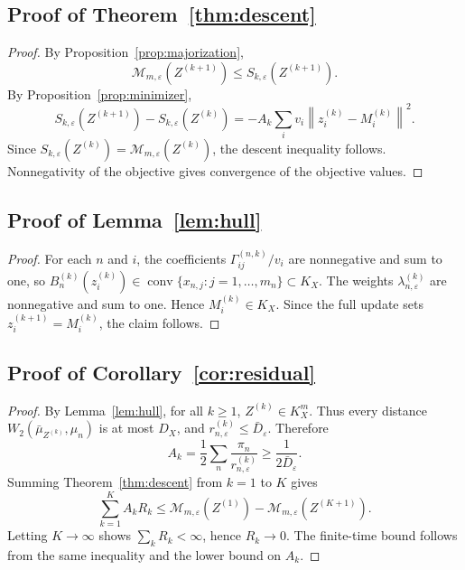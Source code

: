 \documentclass[pdflatex,sn-mathphys-ay]{sn-jnl}%
\theoremstyle{thmstyleone}%
\theoremstyle{thmstyletwo}%
\theoremstyle{thmstylethree}%
\newcommand{\calM}{\mathcal M}
\newcommand{\eps}{\varepsilon}
\newcommand{\barmu}{\bar\mu}
\newcommand{\conv}{\operatorname{conv}}
\newcommand{\norm}[1]{\left\lVert #1\right\rVert}
\begin{document}
\begin{appendices}
\subsection{Proof of Theorem~\ref{thm:descent}}
\begin{proof}
By Proposition~\ref{prop:majorization},
\[
\calM_{m,\eps}(Z^{(k+1)})\le S_{k,\eps}(Z^{(k+1)}).
\]
By Proposition~\ref{prop:minimizer},
\[
S_{k,\eps}(Z^{(k+1)})-S_{k,\eps}(Z^{(k)})
=
-A_k\sum_i v_i\norm{z_i^{(k)}-M_i^{(k)}}^2.
\]
Since \(S_{k,\eps}(Z^{(k)})=\calM_{m,\eps}(Z^{(k)})\), the descent inequality follows. Nonnegativity of the objective gives convergence of the objective values.
\end{proof}

\subsection{Proof of Lemma~\ref{lem:hull}}
\begin{proof}
For each \(n\) and \(i\), the coefficients \(\Gamma_{ij}^{(n,k)}/v_i\) are nonnegative and sum to one, so \(B_n^{(k)}(z_i^{(k)})\in\conv\{x_{n,j}:j=1,\ldots,m_n\}\subset K_X\). The weights \(\lambda_{n,\eps}^{(k)}\) are nonnegative and sum to one. Hence \(M_i^{(k)}\in K_X\). Since the full update sets \(z_i^{(k+1)}=M_i^{(k)}\), the claim follows.
\end{proof}

\subsection{Proof of Corollary~\ref{cor:residual}}
\begin{proof}
By Lemma~\ref{lem:hull}, for all \(k\ge1\), \(Z^{(k)}\in K_X^m\). Thus every distance \(W_2(\barmu_{Z^{(k)}},\mu_n)\) is at most \(D_X\), and \(r_{n,\eps}^{(k)}\le\bar D_\eps\). Therefore
\[
A_k=\frac12\sum_n\frac{\pi_n}{r_{n,\eps}^{(k)}}\ge\frac{1}{2\bar D_\eps}.
\]
Summing Theorem~\ref{thm:descent} from \(k=1\) to \(K\) gives
\[
\sum_{k=1}^{K} A_kR_k
\le
\calM_{m,\eps}(Z^{(1)})-\calM_{m,\eps}(Z^{(K+1)}).
\]
Letting \(K\to\infty\) shows \(\sum_k R_k<\infty\), hence \(R_k\to0\). The finite-time bound follows from the same inequality and the lower bound on \(A_k\).
\end{proof}


\end{appendices}
\end{document}
